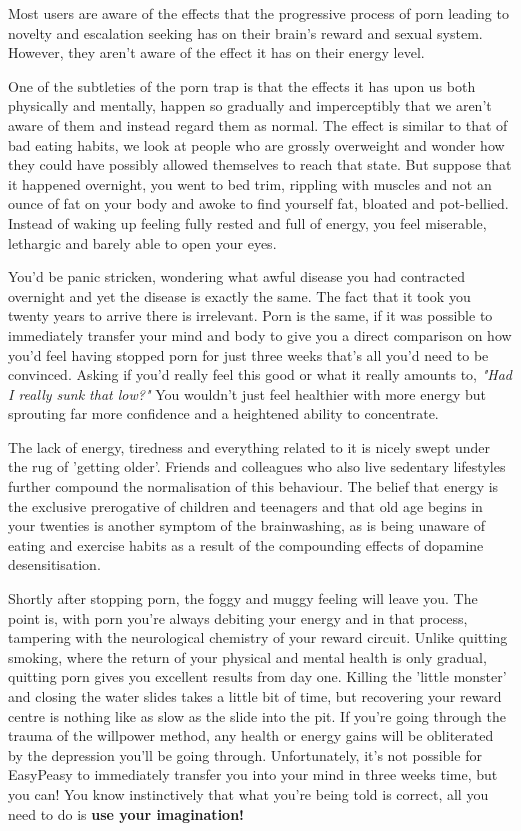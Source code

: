 \documentclass[easypeasy.tex]{subfiles}
\begin{document}
Most users are aware of the effects that the progressive process of porn leading to novelty and escalation seeking has on their brain's reward and sexual system. However, they aren't aware of the effect it has on their energy level.

One of the subtleties of the porn trap is that the effects it has upon us both physically and mentally, happen so gradually and imperceptibly that we aren't aware of them and instead regard them as normal. The effect is similar to that of bad eating habits, we look at people who are grossly overweight and wonder how they could have possibly allowed themselves to reach that state. But suppose that it happened overnight, you went to bed trim, rippling with muscles and not an ounce of fat on your body and awoke to find yourself fat, bloated and pot-bellied. Instead of waking up feeling fully rested and full of energy, you feel miserable, lethargic and barely able to open your eyes.

You'd be panic stricken, wondering what awful disease you had contracted overnight and yet the disease is exactly the same. The fact that it took you twenty years to arrive there is irrelevant. Porn is the same, if it was possible to immediately transfer your mind and body to give you a direct comparison on how you'd feel having stopped porn for just three weeks that's all you'd need to be convinced. Asking if you'd really feel this good or what it really amounts to, \textit{"Had I really sunk that low?"} You wouldn't just feel healthier with more energy but sprouting far more confidence and a heightened ability to concentrate.

The lack of energy, tiredness and everything related to it is nicely swept under the rug of 'getting older'. Friends and colleagues who also live sedentary lifestyles further compound the normalisation of this behaviour. The belief that energy is the exclusive prerogative of children and teenagers and that old age begins in your twenties is another symptom of the brainwashing, as is being unaware of eating and exercise habits as a result of the compounding effects of dopamine desensitisation.

Shortly after stopping porn, the foggy and muggy feeling will leave you. The point is, with porn you're always debiting your energy and in that process, tampering with the neurological chemistry of your reward circuit. Unlike quitting smoking, where the return of your physical and mental health is only gradual, quitting porn gives you excellent results from day one. Killing the 'little monster' and closing the water slides takes a little bit of time, but recovering your reward centre is nothing like as slow as the slide into the pit. If you're going through the trauma of the willpower method, any health or energy gains will be obliterated by the depression you'll be going through. Unfortunately, it's not possible for EasyPeasy to immediately transfer you into your mind in three weeks time, but you can! You know instinctively that what you're being told is correct, all you need to do is \textbf{use your imagination!}
\end{document}
